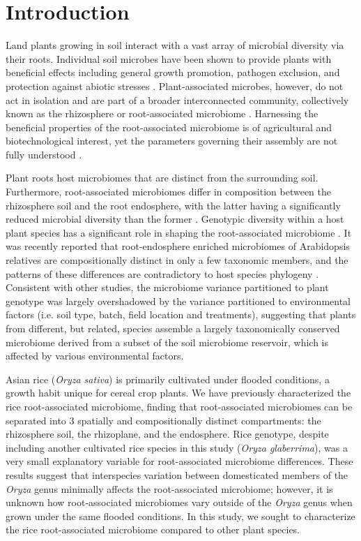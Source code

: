 \section{Introduction}
Land plants growing in soil interact with a vast array of microbial diversity via their roots. Individual soil microbes have been shown to provide plants with beneficial effects including general growth promotion, pathogen exclusion, and protection against abiotic stresses \cite{Berendsen2012}. Plant-associated microbes, however, do not act in isolation and are part of a broader interconnected community, collectively known as the rhizosphere or root-associated microbiome \cite{Bulgarelli2013}. Harnessing the beneficial properties of the root-associated microbiome is of agricultural and biotechnological interest, yet the parameters governing their assembly are not fully understood \cite{Bulgarelli2013}. 

Plant roots host microbiomes that are distinct from the surrounding soil. Furthermore, root-associated microbiomes differ in composition between the rhizosphere soil and the root endosphere, with the latter having a significantly reduced microbial diversity than the former \cite{Lundberg2012,Bulgarelli2012,Edwards2015,Peiffer2013,Wagner2016,Zarraonaindia2015}. Genotypic diversity within a host plant species has a significant role in shaping the root-associated microbiome \cite{Lundberg2012,Wagner2016,Peiffer2013,Edwards2015}. It was recently reported that root-endosphere enriched microbiomes of Arabidopsis relatives are compositionally distinct in only a few taxonomic members, and the patterns of these differences are contradictory to host species phylogeny \cite{Schlaeppi2014}. Consistent with other studies, the microbiome variance partitioned to plant genotype was largely overshadowed by the variance partitioned to environmental factors (i.e. soil type, batch, field location and treatments), suggesting that plants from different, but related, species assemble a largely taxonomically conserved microbiome derived from a subset of the soil microbiome reservoir, which is affected by various environmental factors.

Asian rice (\textit{Oryza sativa}) is primarily cultivated under flooded conditions, a growth habit unique for cereal crop plants. We have previously characterized the rice root-associated microbiome, finding that root-associated microbiomes can be separated into 3 spatially and compositionally distinct compartments: the rhizosphere soil, the rhizoplane, and the endosphere. Rice genotype, despite including another cultivated rice species in this study (\textit{Oryza glaberrima}), was a very small explanatory variable for root-associated microbiome differences. These results suggest that interspecies variation between domesticated members of the \textit{Oryza} genus minimally affects the root-associated microbiome; however, it is unknown how root-associated microbiomes vary outside of the \textit{Oryza} genus when grown under the same flooded conditions. In this study, we sought to characterize the rice root-associated microbiome compared to other plant species.

